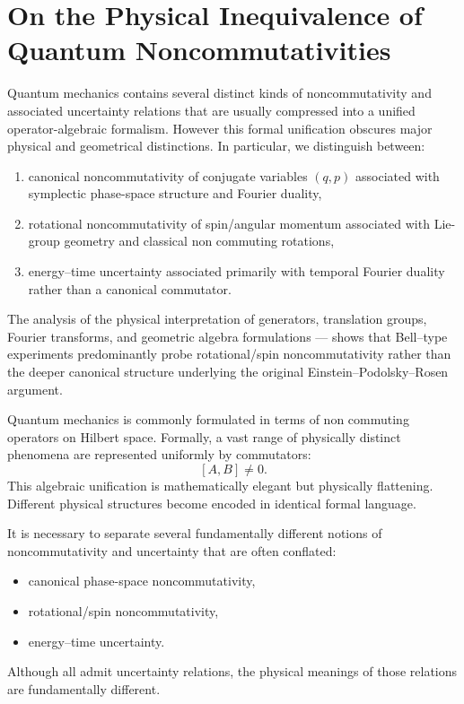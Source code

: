 \section{On the Physical Inequivalence of Quantum Noncommutativities}
Quantum mechanics contains several distinct kinds of noncommutativity 
and associated uncertainty relations that are usually compressed into 
a unified operator-algebraic formalism. However this formal 
unification obscures major physical and geometrical distinctions. 
In particular, we distinguish between:
\begin{enumerate}
\item canonical noncommutativity of conjugate variables $(q,p)$ associated
    with symplectic phase-space structure and Fourier duality,
\item rotational noncommutativity of spin/angular momentum associated with 
    Lie-group geometry and classical non commuting rotations,
\item energy--time uncertainty associated primarily with temporal Fourier 
    duality rather than a canonical commutator.
\end{enumerate}
The analysis of the physical interpretation of generators, translation groups, 
Fourier transforms, and geometric algebra formulations --- shows that Bell--type
experiments predominantly probe rotational/spin noncommutativity rather than
the deeper canonical structure underlying the original Einstein--Podolsky--Rosen argument.

Quantum mechanics is commonly formulated in terms of non commuting operators 
on Hilbert space. Formally, a vast range of physically distinct phenomena 
are represented uniformly by commutators:
\[ [A,B]\neq0. \]
This algebraic unification is mathematically elegant but physically flattening. 
Different physical structures become encoded in identical formal language.

It is necessary to separate several fundamentally different notions of 
noncommutativity and uncertainty that are often conflated:
\begin{itemize}
\item canonical phase-space noncommutativity,
\item rotational/spin noncommutativity,
\item energy--time uncertainty.
\end{itemize}
Although all admit uncertainty relations, the physical meanings of 
those relations are fundamentally different.

